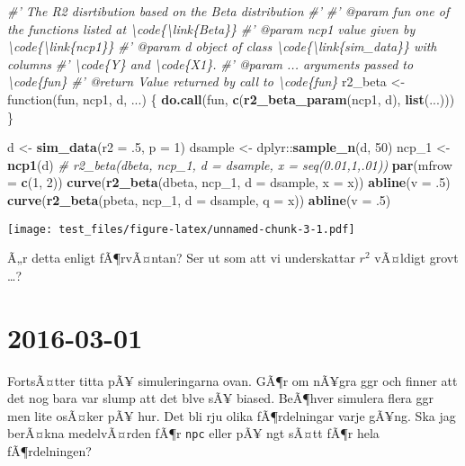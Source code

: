\documentclass[]{article}
\newenvironment{Shaded}{\begin{snugshade}}{\end{snugshade}}
\newcommand{\KeywordTok}[1]{\textcolor[rgb]{0.13,0.29,0.53}{\textbf{{#1}}}}
\newcommand{\DataTypeTok}[1]{\textcolor[rgb]{0.13,0.29,0.53}{{#1}}}
\newcommand{\DecValTok}[1]{\textcolor[rgb]{0.00,0.00,0.81}{{#1}}}
\newcommand{\StringTok}[1]{\textcolor[rgb]{0.31,0.60,0.02}{{#1}}}
\newcommand{\CommentTok}[1]{\textcolor[rgb]{0.56,0.35,0.01}{\textit{{#1}}}}
\newcommand{\NormalTok}[1]{{#1}}
\begin{document}
\begin{Shaded}
\begin{Highlighting}[]
\CommentTok{#' The R2 disrtibution based on the Beta distribution}
\CommentTok{#'}
\CommentTok{#' @param fun one of the functions listed at \textbackslash{}code\{\textbackslash{}link\{Beta\}\}}
\CommentTok{#' @param ncp1 value given by \textbackslash{}code\{\textbackslash{}link\{ncp1\}\}}
\CommentTok{#' @param d object of class \textbackslash{}code\{\textbackslash{}link\{sim_data\}\} with columns }
\CommentTok{#' \textbackslash{}code\{Y\} and \textbackslash{}code\{X1\}.}
\CommentTok{#' @param ... arguments passed to \textbackslash{}code\{fun\} }
\CommentTok{#' @return Value returned by call to \textbackslash{}code\{fun\}}
\NormalTok{r2_beta <-}\StringTok{ }\NormalTok{function(fun, ncp1, d, ...) \{}
  \KeywordTok{do.call}\NormalTok{(fun, }\KeywordTok{c}\NormalTok{(}\KeywordTok{r2_beta_param}\NormalTok{(ncp1, d), }\KeywordTok{list}\NormalTok{(...)))}
\NormalTok{\}}


\NormalTok{d <-}\StringTok{ }\KeywordTok{sim_data}\NormalTok{(}\DataTypeTok{r2 =} \NormalTok{.}\DecValTok{5}\NormalTok{, }\DataTypeTok{p =} \DecValTok{1}\NormalTok{)}
\NormalTok{dsample <-}\StringTok{ }\NormalTok{dplyr::}\KeywordTok{sample_n}\NormalTok{(d, }\DecValTok{50}\NormalTok{)}
\NormalTok{ncp_1 <-}\StringTok{ }\KeywordTok{ncp1}\NormalTok{(d)}
\CommentTok{# r2_beta(dbeta, ncp_1, d = dsample, x = seq(0.01,1,.01))}
\KeywordTok{par}\NormalTok{(}\DataTypeTok{mfrow =} \KeywordTok{c}\NormalTok{(}\DecValTok{1}\NormalTok{, }\DecValTok{2}\NormalTok{))}
\KeywordTok{curve}\NormalTok{(}\KeywordTok{r2_beta}\NormalTok{(dbeta, ncp_1, }\DataTypeTok{d =} \NormalTok{dsample, }\DataTypeTok{x =} \NormalTok{x))}
\KeywordTok{abline}\NormalTok{(}\DataTypeTok{v =} \NormalTok{.}\DecValTok{5}\NormalTok{)}
\KeywordTok{curve}\NormalTok{(}\KeywordTok{r2_beta}\NormalTok{(pbeta, ncp_1, }\DataTypeTok{d =} \NormalTok{dsample, }\DataTypeTok{q =} \NormalTok{x))}
\KeywordTok{abline}\NormalTok{(}\DataTypeTok{v =} \NormalTok{.}\DecValTok{5}\NormalTok{)}
\end{Highlighting}
\end{Shaded}

\texttt{[image: test\_files/figure-latex/unnamed-chunk-3-1.pdf]}

Ã„r detta enligt fÃ¶rvÃ¤ntan? Ser ut som att vi underskattar \(r^2\)
vÃ¤ldigt grovt \ldots{}?

\section{2016-03-01}\label{section-1}

FortsÃ¤tter titta pÃ¥ simuleringarna ovan. GÃ¶r om nÃ¥gra ggr och finner
att det nog bara var slump att det blve sÃ¥ biased. BeÃ¶hver simulera
flera ggr men lite osÃ¤ker pÃ¥ hur. Det bli rju olika fÃ¶rdelningar
varje gÃ¥ng. Ska jag berÃ¤kna medelvÃ¤rden fÃ¶r \texttt{npc} eller pÃ¥
ngt sÃ¤tt fÃ¶r hela fÃ¶rdelningen?
\end{document}
